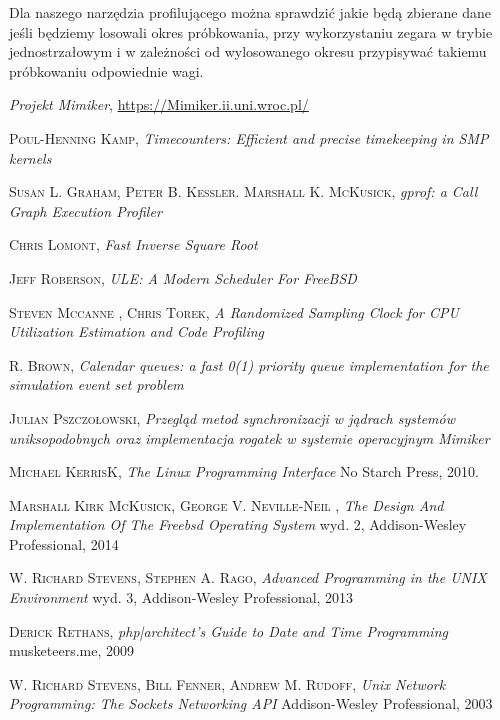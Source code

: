 \documentclass[shortabstract]{iithesis}
\theoremstyle{definition} \newtheorem*{definition}{Definicja}
\theoremstyle{definition} \newtheorem*{example}{Przykład}
\theoremstyle{definition} \newtheorem*{remark}{Uwaga}
\begin{document}
Dla naszego narzędzia profilującego można sprawdzić jakie będą zbierane dane jeśli będziemy losowali okres próbkowania, przy wykorzystaniu zegara w trybie jednostrzałowym i w zależności od wylosowanego okresu przypisywać takiemu próbkowaniu odpowiednie wagi.


\begin{thebibliography}{100}

\textit{Projekt Mimiker},
\url{https://Mimiker.ii.uni.wroc.pl/}

\textsc{Poul-Henning Kamp},
\textit{Timecounters: Efficient and precise timekeeping in SMP kernels}

\textsc{Susan L. Graham, Peter B. Kessler. Marshall K. McKusick},
\textit{gprof: a Call Graph Execution Profiler}

\textsc{Chris Lomont},
\textit{Fast Inverse Square Root}

\textsc{Jeff Roberson},
\textit{ULE: A Modern Scheduler For FreeBSD}

\textsc{Steven Mccanne , Chris Torek},
\textit{A Randomized Sampling Clock for CPU Utilization Estimation and Code Profiling}

\textsc{R. Brown},
\textit{Calendar queues: a fast 0(1) priority queue implementation for the simulation event set problem}

\textsc{Julian Pszczołowski},
\textit{Przegląd metod synchronizacji w jądrach systemów uniksopodobnych oraz implementacja rogatek w systemie operacyjnym Mimiker}


\textsc{Michael KerrisK},
\textit{The Linux Programming Interface}
No Starch Press, 2010.

\textsc{Marshall Kirk McKusick, George V. Neville-Neil },
\textit{The Design And Implementation Of The Freebsd Operating System}
wyd. 2, Addison-Wesley Professional, 2014

\textsc{W. Richard Stevens, Stephen A. Rago},
\textit{Advanced Programming in the UNIX Environment}
wyd. 3, Addison-Wesley Professional, 2013

\textsc{Derick Rethans},
\textit{php|architect’s Guide to Date and Time Programming}
musketeers.me, 2009

\textsc{W. Richard Stevens, Bill Fenner, Andrew M. Rudoff},
\textit{Unix Network Programming: The Sockets Networking API}
Addison-Wesley Professional, 2003


\end{thebibliography}
\end{document}

